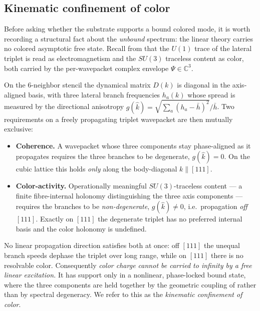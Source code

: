\subsection{Kinematic confinement of color}
\label{sec:color-confinement}

Before asking whether the substrate supports a bound colored mode, it is worth recording a
structural fact about the \emph{unbound} spectrum: the linear theory carries no colored asymptotic
free state. Recall from  that the $U(1)$ trace of the lateral triplet is read as
electromagnetism and the $SU(3)$ traceless content as color, both carried by the per-wavepacket
complex envelope $\Psi \in \mathbb{C}^3$.

On the 6-neighbor stencil the dynamical matrix $D(k)$ is diagonal in the axis-aligned basis, with
three lateral branch frequencies $h_a(k)$ whose spread is measured by the directional anisotropy
$g(\hat k) = \sqrt{\sum_a (h_a - \bar h)^2}/\bar h$. Two requirements on a freely propagating triplet
wavepacket are then mutually exclusive:
\begin{itemize}
  \item \textbf{Coherence.} A wavepacket whose three components stay phase-aligned as it propagates
    requires the three branches to be degenerate, $g(\hat k) = 0$. On the cubic lattice this holds
    \emph{only} along the body-diagonal $k \parallel [111]$.
  \item \textbf{Color-activity.} Operationally meaningful $SU(3)$-traceless content --- a finite
    fibre-internal holonomy distinguishing the three axis components --- requires the branches to be
    \emph{non-degenerate}, $g(\hat k) \neq 0$, i.e.\ propagation \emph{off} $[111]$. Exactly on
    $[111]$ the degenerate triplet has no preferred internal basis and the color holonomy is
    undefined.
\end{itemize}
No linear propagation direction satisfies both at once: off $[111]$ the unequal branch speeds
dephase the triplet over long range, while on $[111]$ there is no resolvable color. Consequently
\emph{color charge cannot be carried to infinity by a free linear excitation.} It has support only
in a nonlinear, phase-locked bound state, where the three components are held together by the
geometric coupling of  rather than by spectral degeneracy. We refer to
this as the \emph{kinematic confinement of color}.

